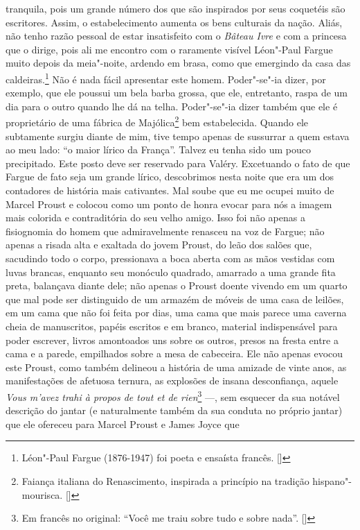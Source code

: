 tranquila, pois um grande número dos que são inspirados por seus
coquetéis são escritores. Assim, o estabelecimento aumenta os bens
culturais da nação. Aliás, não tenho razão pessoal de estar insatisfeito
com o \emph{Bâteau Ivre} e com a princesa que o dirige, pois ali me
encontro com o raramente visível Léon"-Paul Fargue muito depois da
meia"-noite, ardendo em brasa, como que emergindo da casa das
caldeiras.\footnote{Léon"-Paul Fargue (1876-1947) foi poeta e
  ensaísta francês. []} Não é nada fácil apresentar este homem.
Poder"-se"-ia dizer, por exemplo, que ele poussui um bela barba grossa,
que ele, entretanto, raspa de um dia para o outro quando lhe dá na
telha. Poder"-se"-ia dizer também que ele é proprietário de uma fábrica de
Majólica\footnote{Faiança italiana do Renascimento, inspirada a
  princípio na tradição hispano"-mourisca. []} bem estabelecida. Quando ele
subtamente surgiu diante de mim, tive tempo apenas de sussurrar a quem
estava ao meu lado: ``o maior lírico da França''. Talvez eu tenha sido
um pouco precipitado. Este posto deve ser reservado para Valéry.
Excetuando o fato de que Fargue de fato seja um grande lírico,
descobrimos nesta noite que era um dos contadores de história mais
cativantes. Mal soube que eu me ocupei muito de Marcel Proust e colocou
como um ponto de honra evocar para nós a imagem mais colorida e
contraditória do seu velho amigo. Isso foi não apenas a fisiognomia do
homem que admiravelmente renasceu na voz de Fargue; não apenas a risada
alta e exaltada do jovem Proust, do leão dos salões que, sacudindo todo
o corpo, pressionava a boca aberta com as mãos vestidas com luvas
brancas, enquanto seu monóculo quadrado, amarrado a uma grande fita
preta, balançava diante dele; não apenas o Proust doente vivendo em um
quarto que mal pode ser distinguido de um armazém de móveis de uma casa
de leilões, em um cama que não foi feita por dias, uma cama que mais
parece uma caverna cheia de manuscritos, papéis escritos e em branco,
material indispensável para poder escrever, livros amontoados uns sobre
os outros, presos na fresta entre a cama e a parede, empilhados sobre a
mesa de cabeceira. Ele não apenas evocou este Proust, como também
delineou a história de uma amizade de vinte anos, as manifestações de
afetuosa ternura, as explosões de insana desconfiança, aquele \emph{Vous
m'avez trahi à propos de tout et de rien}\footnote{Em francês no original: ``Você me traiu sobre tudo e sobre nada''. []} ---, sem esquecer
da sua notável descrição do jantar (e naturalmente também da sua conduta
no próprio jantar) que ele ofereceu para Marcel Proust e James Joyce que
